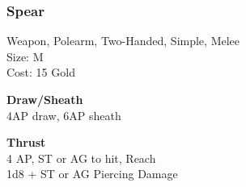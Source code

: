 \subsubsection{Spear}\label{weapon:spear}
Weapon, Polearm, Two-Handed, Simple, Melee\\
Size: M\\
Cost: 15 Gold

\textbf{Draw/Sheath}\\
4AP draw, 6AP sheath

\textbf{Thrust}\\
4 AP, ST or AG to hit,  Reach\\
1d8 + \texttimes ST or AG Piercing Damage

